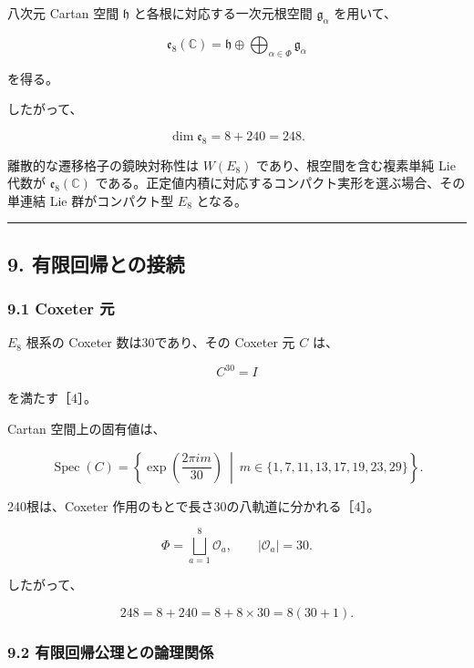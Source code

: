 \documentclass[
  a4paper,
  ja=minimal,
  xelatex,
  paragraph-mark={},
]{bxjsarticle}
\begin{document}
八次元 Cartan 空間 \(\mathfrak h\) と各根に対応する一次元根空間
\(\mathfrak g_\alpha\) を用いて、

\[
\mathfrak e_8(\mathbb C)
{}=
\mathfrak h
\oplus
\bigoplus_{\alpha\in\Phi}
\mathfrak g_\alpha
\]

を得る。

したがって、

\[
\boxed{
\dim\mathfrak e_8
{}=
8+240
{}=248.
}
\]

離散的な遷移格子の鏡映対称性は \(W(E_8)\) であり、根空間を含む複素単純
Lie 代数が \(\mathfrak e_8(\mathbb C)\)
である。正定値内積に対応するコンパクト実形を選ぶ場合、その単連結 Lie
群がコンパクト型 \(E_8\) となる。

\begin{center}\rule{0.5\linewidth}{0.5pt}\end{center}

\subsection{9.
有限回帰との接続}\label{ux6709ux9650ux56deux5e30ux3068ux306eux63a5ux7d9a}

\subsubsection{9.1 Coxeter 元}\label{coxeter-ux5143}

\(E_8\) 根系の Coxeter 数は30であり、その Coxeter 元 \(C\) は、

\[
\boxed{
C^{30}=I
}
\]

を満たす［4］。

Cartan 空間上の固有値は、

\[
\operatorname{Spec}(C)
{}=
\left\{
\exp
\left(
\frac{2\pi i m}{30}
\right)
\ \middle|\
m\in
\{1,7,11,13,17,19,23,29\}
\right\}.
\]

240根は、Coxeter 作用のもとで長さ30の八軌道に分かれる［4］。

\[
\Phi
{}=
\bigsqcup_{a=1}^{8}
\mathcal O_a,
\qquad
|\mathcal O_a|
{}=30.
\]

したがって、

\[
\boxed{
248
{}=
8+240
{}=
8+8\times30
{}=
8(30+1).
}
\]

\subsubsection{9.2
有限回帰公理との論理関係}\label{ux6709ux9650ux56deux5e30ux516cux7406ux3068ux306eux8ad6ux7406ux95a2ux4fc2}
\end{document}
